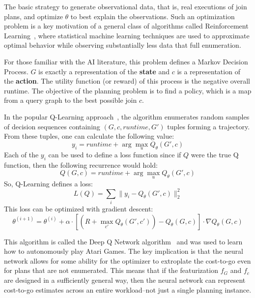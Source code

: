 The basic strategy to generate observational data, that is, real executions of join plans, and optimize $\theta$ to best explain the observations. Such an optimization problem is a key motivation of a general class of algorithms called Reinforcement Learning~\cite{sutton1998reinforcement}, where statistical machine learning techniques are used to approximate optimal behavior while observing substantially less data that full enumeration. 

For those familiar with the AI literature, this problem defines a Markov Decision Process. $G$ is exactly a representation of the \textbf{state} and $c$ is a representation of the \textbf{action}.
The utility function (or reward) of this process is the negative overall runtime.
The objective of the planning problem is to find a policy, which is a map from a query graph to the best possible join $c$.

In the popular Q-Learning approach~\cite{sutton1998reinforcement}, the algorithm enumerates random samples of decision sequences containing $(G,c, runtime, G')$ tuples forming a trajectory. From these tuples, one can calculate the following value:
\[
y_i = runtime + \arg \max_{u} Q_\theta(G',c)
\]
Each of the $y_i$ can be used to define a loss function since if $Q$ were the true Q function, then the following recurrence would hold:
\[
Q(G,c) = runtime + \arg \max_{u} Q_\theta(G',c)
\]
So, Q-Learning defines a loss:
\[
L(Q) = \sum_{i} \|y_i - Q_\theta(G',c)\|_2^2
\]
This loss can be optimized with gradient descent:
\[
\theta^{(i+1)} = \theta^{(i)} + \alpha \cdot [ (R + \max_{c'} Q_\theta(G',c')) - Q_\theta(G,c) ] \cdot \nabla Q_\theta(G,c) 
\]

This algorithm is called the Deep Q Network algorithm~\cite{mnih2015human} and was used to learn how to autonomously play Atari Games.
The key implication is that the neural network allows for some ability for the optimizer to extroplate the cost-to-go even for plans that are not enumerated. This means that if the featurization $f_G$ and $f_c$ are designed in a sufficiently general way, then the neural network can represent cost-to-go estimates across an entire workload--not just a single planning instance.
